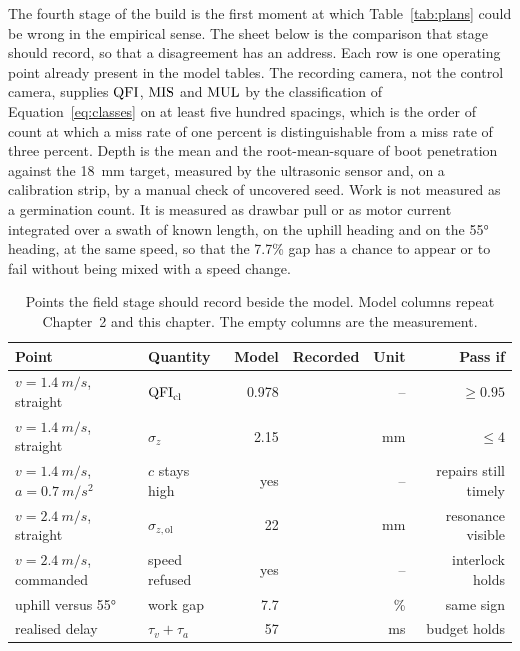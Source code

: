 The fourth stage of the build is the first moment at which Table~\ref{tab:plans} could be wrong in the empirical sense. The sheet below is the comparison that stage should record, so that a disagreement has an address. Each row is one operating point already present in the model tables. The recording camera, not the control camera, supplies \(\mathrm{QFI}\), \(\mathrm{MIS}\) and \(\mathrm{MUL}\) by the classification of Equation~\eqref{eq:classes} on at least five hundred spacings, which is the order of count at which a miss rate of one percent is distinguishable from a miss rate of three percent. Depth is the mean and the root-mean-square of boot penetration against the \SI{18}{mm} target, measured by the ultrasonic sensor and, on a calibration strip, by a manual check of uncovered seed. Work is not measured as a germination count. It is measured as drawbar pull or as motor current integrated over a swath of known length, on the uphill heading and on the \ang{55} heading, at the same speed, so that the \num{7.7}\% gap has a chance to appear or to fail without being mixed with a speed change.

\begin{table}[ht]
\centering
\caption{Points the field stage should record beside the model. Model columns repeat Chapter~2 and this chapter. The empty columns are the measurement.}
\label{tab:sheet}
\small
\begin{tabular}{@{}llrrrr@{}}
\toprule
Point & Quantity & Model & Recorded & Unit & Pass if \\
\midrule
\(v=\SI{1.4}{m/s}\), straight & \(\mathrm{QFI}_{\mathrm{cl}}\) & 0.978 & & -- & \(\ge 0.95\) \\
\(v=\SI{1.4}{m/s}\), straight & \(\sigma_z\) & 2.15 & & mm & \(\le 4\) \\
\(v=\SI{1.4}{m/s}\), \(a=\SI{0.7}{m/s^2}\) & \(c\) stays high & yes & & -- & repairs still timely \\
\(v=\SI{2.4}{m/s}\), straight & \(\sigma_{z,\mathrm{ol}}\) & 22 & & mm & resonance visible \\
\(v=\SI{2.4}{m/s}\), commanded & speed refused & yes & & -- & interlock holds \\
uphill versus \ang{55} & work gap & 7.7 & & \% & same sign \\
realised delay & \(\tau_v+\tau_a\) & 57 & & ms & budget holds \\
\bottomrule
\end{tabular}
\end{table}

